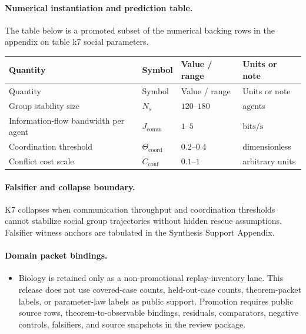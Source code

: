 \paragraph{Numerical instantiation and prediction table.}
The table below is a promoted subset of the numerical backing rows in the appendix on table k7 social parameters.
\begin{longtable}{@{}L{0.27\textwidth}L{0.15\textwidth}L{0.24\textwidth}L{0.16\textwidth}@{}}
\toprule
Quantity & Symbol & Value / range & Units or note \\
\midrule
\endfirsthead
\toprule
Quantity & Symbol & Value / range & Units or note \\
\midrule
\endhead
Group stability size & $\scriptstyle N_s$ & $120\text{--}180$ & agents \\
Information-flow bandwidth per agent & $\scriptstyle J_{\mathrm{comm}}$ & $1\text{--}5$ & $\mathrm{bits/s}$ \\
Coordination threshold & $\scriptstyle \Theta_{\mathrm{coord}}$ & $0.2\text{--}0.4$ & dimensionless \\
Conflict cost scale & $\scriptstyle C_{\mathrm{conf}}$ & $0.1\text{--}1$ & arbitrary units \\
\bottomrule
\end{longtable}

\paragraph{Falsifier and collapse boundary.}
K7 collapses when communication throughput and coordination thresholds cannot stabilize social group trajectories without hidden rescue assumptions.
Falsifier witness anchors are tabulated in the Synthesis Support Appendix.

\paragraph{Domain packet bindings.}
\begin{itemize}[leftmargin=1.6em,nosep]
\item Biology is retained only as a non-promotional replay-inventory lane. This release does not use covered-case counts, held-out-case counts, theorem-packet labels, or parameter-law labels as public support. Promotion requires public source rows, theorem-to-observable bindings, residuals, comparators, negative controls, falsifiers, and source snapshots in the review package.
\end{itemize}


